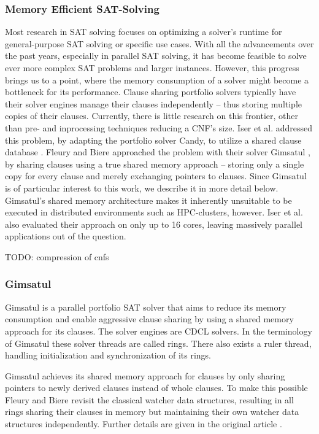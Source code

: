 \documentclass[12pt,a4paper,twoside]{scrartcl}
\numberwithin{equation}{section}
\begin{document}
\subsubsection{Memory Efficient SAT-Solving}

Most research in SAT solving focuses on optimizing a solver's runtime for general-purpose SAT solving or specific use cases. With all the advancements over the past years, especially in parallel SAT solving, it has become feasible to solve ever more complex SAT problems and larger instances. However, this progress brings us to a point, where the memory consumption of a solver might become a bottleneck for its performance. Clause sharing portfolio solvers typically have their solver engines manage their clauses independently -- thus storing multiple copies of their clauses. Currently, there is little research on this frontier, other than pre- and inprocessing techniques reducing a CNF's size. Iser et al. addressed this problem, by adapting the portfolio solver Candy, to utilize a shared clause database \cite{iser2019memory}. Fleury and Biere approached the problem with their solver Gimsatul \cite{gimsatul}, by sharing clauses using a true shared memory approach -- storing only a single copy for every clause and merely exchanging pointers to clauses. Since Gimsatul is of particular interest to this work, we describe it in more detail below. Gimsatul's shared memory architecture makes it inherently unsuitable to be executed in distributed environments such as HPC-clusters, however. Iser et al. also evaluated their approach on only up to 16 cores, leaving massively parallel applications out of the question.

TODO: compression of cnfs

\subsubsection{Gimsatul}

Gimsatul \cite{gimsatul} is a parallel portfolio SAT solver that aims to reduce its memory consumption and enable aggressive clause sharing by using a shared memory approach for its clauses. The solver engines are CDCL solvers. In the terminology of Gimsatul these solver threads are called rings. There also exists a ruler thread, handling initialization and synchronization of its rings.

Gimsatul achieves its shared memory approach for clauses by only sharing pointers to newly derived clauses instead of whole clauses. To make this possible Fleury and Biere revisit the classical watcher data structures, resulting in all rings sharing their clauses in memory but maintaining their own watcher data structures independently. Further details are given in the original article \cite{gimsatul}.
\end{document}
